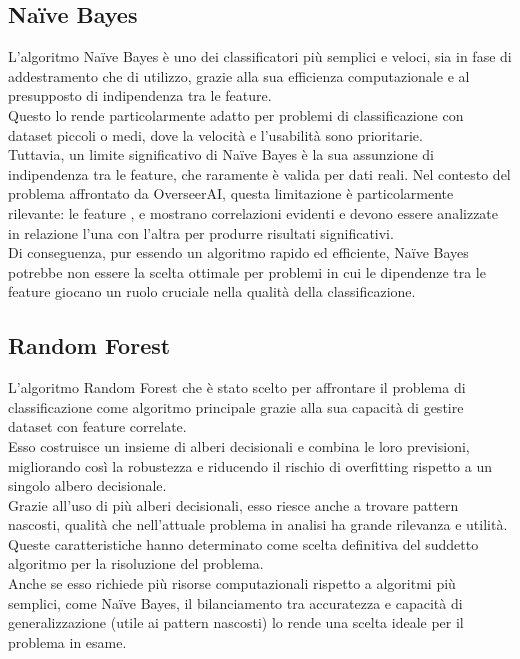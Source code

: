 \documentclass[a4paper,12pt]{report}
\begin{document}
\subsection{Naïve Bayes}
L'algoritmo Naïve Bayes è uno dei classificatori più semplici e veloci, sia in fase di addestramento che di utilizzo, grazie alla sua efficienza computazionale e al presupposto di indipendenza tra le feature. \\
Questo lo rende particolarmente adatto per problemi di classificazione con dataset piccoli o medi, dove la velocità e l'usabilità sono prioritarie. \\ 
Tuttavia, un limite significativo di Naïve Bayes è la sua assunzione di indipendenza tra le feature, che raramente è valida per dati reali. Nel contesto del problema affrontato da OverseerAI, questa limitazione è particolarmente rilevante: le feature \texttt{\color{red}{title}}, \texttt{\color{red}{description}} e \texttt{\color{red}{link\_desc}} mostrano correlazioni evidenti e devono essere analizzate in relazione l'una con l'altra per produrre risultati significativi. \\
Di conseguenza, pur essendo un algoritmo rapido ed efficiente, Naïve Bayes potrebbe non essere la scelta ottimale per problemi in cui le dipendenze tra le feature giocano un ruolo cruciale nella qualità della classificazione.

\subsection{Random Forest}
L'algoritmo Random Forest che è stato scelto per affrontare il problema di classificazione come algoritmo principale grazie alla sua capacità di gestire dataset con feature correlate.\\
Esso costruisce un insieme di alberi decisionali e combina le loro previsioni, migliorando così la robustezza e riducendo il rischio di overfitting rispetto a un singolo albero decisionale. \\
Grazie all'uso di più alberi decisionali, esso riesce anche a trovare pattern nascosti, qualità che nell'attuale problema in analisi ha grande rilevanza e utilità.\\
Queste caratteristiche hanno determinato come scelta definitiva del suddetto algoritmo per la risoluzione del problema.\\
Anche se esso richiede più risorse computazionali rispetto a algoritmi più semplici, come Naïve Bayes, il bilanciamento tra accuratezza e capacità di generalizzazione (utile ai pattern nascosti) lo rende una scelta ideale per il problema in esame.
\end{document}
